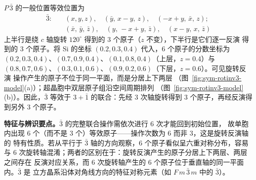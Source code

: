 $P\,\bar3$ 的一般位置等效位置为
\begin{equation}
  \begin{aligned}
    \bar3:\quad &(x,y,z),\quad (\bar y,\,x-y,\,z),\quad (-x+y,\,\bar x,\,z);\\
    &(\bar x,\,\bar y,\,\bar z),\quad (y,\,-x+y,\,\bar z),\quad (x-y,\,x,\,\bar z)
  \end{aligned}
\end{equation}
上半行是绕 $c$ 轴旋转 $120^\circ$ 得到的 3 个原子（$z$ 不变），下半行是它们逐一反演
得到的 3 个原子。将 Si 的坐标 $(0.2,0.3,0.4)$ 代入，6 个原子的分数坐标为
$(0.2,0.3,0.4)$、$(0.7,0.9,0.4)$、$(0.1,0.8,0.4)$（上层，$z=0.4$）与
$(0.8,0.7,0.6)$、$(0.3,0.1,0.6)$、$(0.9,0.2,0.6)$（下层，$z=0.6$）。可见旋转反演
操作产生的原子不位于同一平面，而是分居上下两层
（图~\ref{fig:sym-rotinv3-model}(a)）；超晶胞中双层原子组沿空间周期排列
（图~\ref{fig:sym-rotinv3-model}(b)）。因此，$\bar3$ 等效于 $3+\bar1$ 的联合：先经
3 次轴旋转得到 3 个原子，再经反演得到另外 3 个原子。

\textbf{特征与辨识要点。}$\bar3$ 的完整联合操作需依次进行 6 次才能回到初始位置，
故单胞内出现 6 个（而不是 3 个）等效原子——操作次数为 6 而非 3，这是旋转反演轴的
特有性质。若从平行于 $\bar3$ 轴的方向观察，6 个原子看似呈六重对称分布，容易与
6 次旋转轴混淆；两者的区别在于：旋转反演产生的原子分居上下两层、两层之间存在
反演对应关系，而 6 次旋转轴产生的 6 个原子位于垂直轴的同一平面内。$\bar3$ 是
立方晶系沿体对角线方向的特征对称元素（如 $F\,m\,\bar3\,m$ 中的 $\bar3$）。
